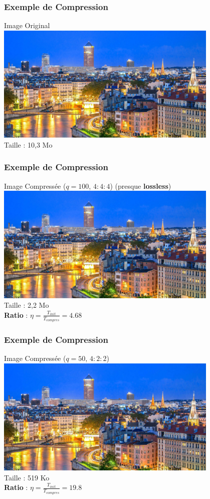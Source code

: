 \documentclass{beamer}
\begin{document}
\begin{frame}
    \frametitle{Exemple de Compression}

    \centering
    Image Original \\
    \includegraphics[width = 0.8\textwidth]{img/villeLyon.jpg} \\
    Taille : 10,3 Mo
\end{frame}

\begin{frame}
    \frametitle{Exemple de Compression}

    \centering
    Image Compressée ($q = 100$, $4:4:4$) (presque \textbf{lossless}) \\
    \includegraphics[width = 0.8\textwidth]{img/villeLyon.jpg} \\
    Taille : 2,2 Mo \\
    \textbf{Ratio} : $\eta = \frac{T_{init}}{T_{compres}} = 4.68 $

\end{frame}

\begin{frame}
    \frametitle{Exemple de Compression}

    \centering
    Image Compressée ($q = 50$, $4:2:2$) \\
    \includegraphics[width = 0.8\textwidth]{img/villeLyonMid.jpg} \\
    Taille : 519 Ko \\
    \textbf{Ratio} : $\eta = \frac{T_{init}}{T_{compres}} = 19.8$
    
\end{frame}
\end{document}
